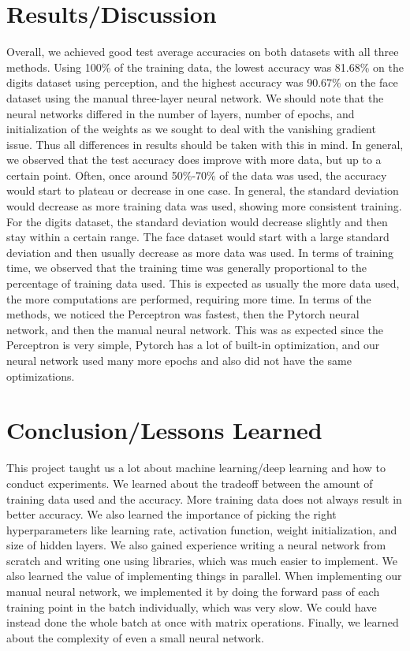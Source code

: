 \documentclass{article}
\begin{document}
\section*{Results/Discussion}
Overall, we achieved good test average accuracies on both datasets with all three methods. Using 100\% of the training data, the lowest accuracy was 81.68\% on the digits dataset using perception, and the highest accuracy was 90.67\% on the face dataset using the manual three-layer neural network. We should note that the neural networks differed in the number of layers, number of epochs, and initialization of the weights as we sought to deal with the vanishing gradient issue. Thus all differences in results should be taken with this in mind. In general, we observed that the test accuracy does improve with more data, but up to a certain point. Often, once around 50\%-70\% of the data was used, the accuracy would start to plateau or decrease in one case. In general, the standard deviation would decrease as more training data was used, showing more consistent training. For the digits dataset, the standard deviation would decrease slightly and then stay within a certain range. The face dataset would start with a large standard deviation and then usually decrease as more data was used. In terms of training time, we observed that the training time was generally proportional to the percentage of training data used. This is expected as usually the more data used, the more computations are performed, requiring more time. In terms of the methods, we noticed the Perceptron was fastest, then the Pytorch neural network, and then the manual neural network. This was as expected since the Perceptron is very simple, Pytorch has a lot of built-in optimization, and our neural network used many more epochs and also did not have the same optimizations.

\section*{Conclusion/Lessons Learned}
This project taught us a lot about machine learning/deep learning and how to conduct experiments. We learned about the tradeoff between the amount of training data used and the accuracy. More training data does not always result in better accuracy. We also learned the importance of picking the right hyperparameters like learning rate, activation function, weight initialization, and size of hidden layers. We also gained experience writing a neural network from scratch and writing one using libraries, which was much easier to implement. We also learned the value of implementing things in parallel. When implementing our manual neural network, we implemented it by doing 
the forward pass of each training point in the batch individually, which was very slow.
We could have instead done the whole batch at once with matrix operations. Finally, we learned about the complexity of even a small neural network.
\end{document}
